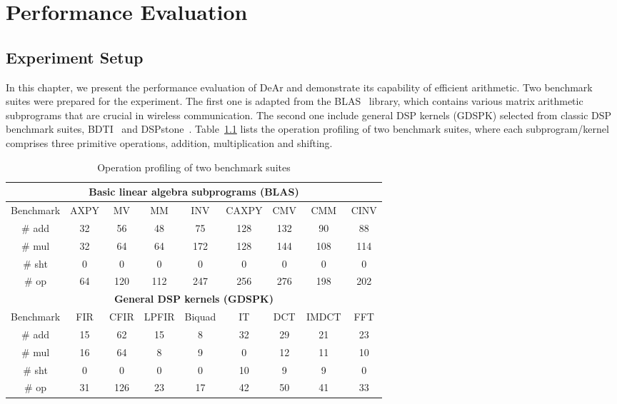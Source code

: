 \chapter{Performance Evaluation}
\section{Experiment Setup}
\label{sec:evaluation:setup}
In this chapter, we present the performance evaluation of DeAr and demonstrate its capability of efficient arithmetic.
Two benchmark suites were prepared for the experiment.
The first one is adapted from the BLAS~\cite{blas} library, 
which contains various matrix arithmetic subprograms that are crucial in wireless communication.
The second one include general DSP kernels (GDSPK) selected from classic DSP benchmark suites, BDTI~\cite{bdti} and DSPstone~\cite{dspstone}.
Table~\ref{tab:op} lists the operation profiling of two benchmark suites, 
where each subprogram/kernel comprises three primitive operations, addition, multiplication and shifting.
\begin{table}[!ht]
    \centering
    \caption{Operation profiling of two benchmark suites}
    \label{tab:op}
    \resizebox{\columnwidth}{!}
    {
        \begin{tabular}{|c|c|c|c|c|c|c|c|c|}
            \hline
            \multicolumn{9}{|c|}{\textbf{Basic linear algebra subprograms (BLAS)}} \\ \hline
            Benchmark              & AXPY   & MV     & MM      & INV      & CAXPY  & CMV  & CMM    & CINV  \\ \hline
            \# add            &  32    &  56    &   48    &    75    &  128   & 132  &   90   &  88   \\ \hline
            \# mul            &  32    &  64    &   64    &   172    &  128   & 144  &  108   & 114   \\ \hline
            \# sht            &   0    &   0    &    0    &     0    &    0   &   0  &    0   &   0   \\ \hline
            \# op             &  64    & 120    &  112    &   247    &  256   & 276  &  198   & 202   \\ \hline
            \multicolumn{9}{|c|}{\textbf{General DSP kernels (GDSPK)}}                     \\ \hline
            Benchmark              & FIR    & CFIR   & LPFIR   & Biquad   & IT     & DCT  & IMDCT  & FFT   \\ \hline
            \# add            & 15     &  62    &   15    &    8     &  32    &  29  &   21   &  23   \\ \hline
            \# mul            & 16     &  64    &    8    &    9     &   0    &  12  &   11   &  10   \\ \hline
            \# sht            &  0     &   0    &    0    &    0     &  10    &   9  &    9   &   0   \\ \hline
            \# op             & 31     & 126    &   23    &   17     &  42    &  50  &   41   &  33   \\ \hline
        \end{tabular}
    }
\end{table}
